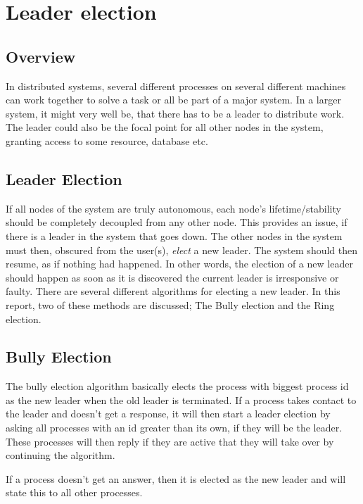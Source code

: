 \section{Leader election}

\subsection{Overview} 

In distributed systems, several different processes on several different machines can work together to solve a task or all be part of a major system. In a larger system, it might very well be, that there has to be a leader to distribute work. The leader could also be the focal point for all other nodes in the system, granting access to some resource, database etc. 

\subsection{Leader Election} 

If all nodes of the system are truly autonomous, each node's lifetime/stability should be completely decoupled from any other node. This provides an issue, if there is a leader in the system that goes down. The other nodes in the system must then, obscured from the user(s), \textit{elect} a new leader. The system should then resume, as if nothing had happened. In other words, the election of a new leader should happen as soon as it is discovered the current leader is irresponsive or faulty. There are several different algorithms for electing a new leader. In this report, two of these methods are discussed; The Bully election and the Ring election.

\subsection{Bully Election}
The bully election algorithm basically elects the process with biggest process id as the new leader when the old leader is terminated. 
If a process takes contact to the leader and doesn't get a response, it will then start a leader election by asking all processes with an id greater than its own, if they will be the leader. These processes will then reply if they are active that they will take over by continuing the algorithm. 

If a process doesn't get an answer, then it is elected as the new leader and will state this to all other processes.

